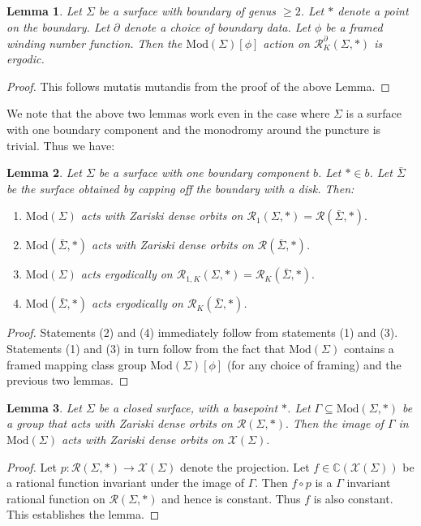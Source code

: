 \documentclass{article}
\newcommand{\XX}{\mathcal{X}}
\newcommand{\Rc}{\mathcal{R}}
\newcommand{\CC}{\mathbb{C}}
\newcommand{\Mod}{\textrm{Mod}}
\newtheorem{lemma}{Lemma}[theorem]
\begin{document}
\begin{lemma}\label{framedenseerg}
    Let $\Sigma$ be a surface with boundary of genus $ \ge 2$. Let $*$ denote a point on the boundary. Let $\partial$ denote a choice of boundary data. Let $\phi$ be a framed winding number function. Then the $\Mod(\Sigma)[\phi]$ action on  $\Rc^{\partial}_K(\Sigma, *)$ is ergodic.
\end{lemma}
\begin{proof}
    This follows mutatis mutandis from the proof of the above Lemma.
\end{proof}

We note that the above two lemmas work even in the case where $\Sigma$ is a surface with one boundary component and the monodromy around the puncture is trivial. Thus we have:
\begin{lemma}
    Let $\Sigma$ be a surface with one boundary component $b$. Let $* \in b$. Let $\bar\Sigma$ be the surface obtained by capping off the boundary with a disk.
    Then:
    \begin{enumerate}
        \item $\Mod(\Sigma)$ acts with Zariski dense orbits on $\Rc_1(\Sigma, *) = \Rc(\bar \Sigma, *).$
        \item $\Mod(\bar \Sigma, *)$ acts with Zariski dense orbits on $\Rc(\bar \Sigma, *)$.
        \item $\Mod(\Sigma)$ acts ergodically on $\Rc_{1,K}(\Sigma, *) = \Rc_K(\bar \Sigma, *).$
        \item   $\Mod(\bar \Sigma, *)$ acts ergodically on $\Rc_K(\bar \Sigma, *)$.
    \end{enumerate} 
\end{lemma}
\begin{proof}
    Statements (2) and (4) immediately follow from statements (1) and (3). Statements (1) and (3) in  turn follow from the fact that $\Mod(\Sigma)$ contains a framed mapping class group $\Mod(\Sigma)[\phi]$ (for any  choice of framing) and the previous two lemmas.
\end{proof}




\begin{lemma}\label{rempunct}
    Let $\Sigma$ be a closed surface, with a basepoint $*$. Let $\Gamma \subseteq \Mod(\Sigma,*) $ be a group that acts with Zariski dense orbits on $\Rc(\Sigma, *).$ Then the image of $\Gamma$ in $\Mod(\Sigma)$ acts with Zariski dense orbits on $\XX(\Sigma).$
\end{lemma}
\begin{proof}
    Let $p: \Rc(\Sigma,*) \to \XX(\Sigma)$ denote the projection. Let $f \in \CC(\XX(\Sigma))$ be a rational function invariant under the image of $\Gamma.$ Then $f \circ p$ is a $\Gamma$ invariant rational function on $\Rc(\Sigma, *)$ and hence is constant. Thus $f$ is also constant. This establishes the lemma.
\end{proof}
\end{document}
